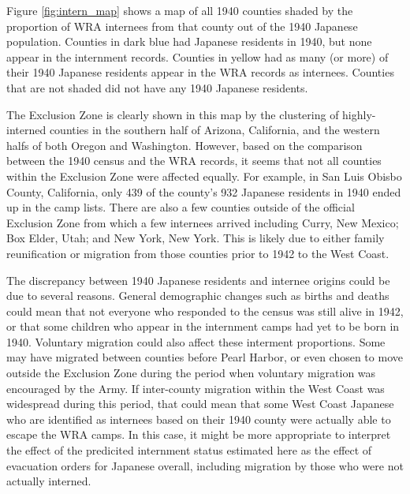 Figure \ref{fig:intern_map} shows a map of all 1940 counties
shaded by the proportion of WRA internees from that county
out of the 1940 Japanese population.
Counties in dark blue had Japanese residents in 1940,
but none appear in the internment records.
Counties in yellow had as many (or more) of their 1940 Japanese residents
appear in the WRA records as internees.
Counties that are not shaded did not have any 1940 Japanese residents.



The Exclusion Zone is clearly shown in this map
by the clustering of highly-interned counties in the southern half of Arizona,
California, and the western halfs of both Oregon and Washington.
However, based on the comparison between the 1940 census and the WRA records,
it seems that not all counties within the Exclusion Zone 
were affected equally.
For example, in San Luis Obisbo County, California,
only 439 of the county's 932 Japanese residents in 1940
ended up in the camp lists.
There are also a few counties outside of the official Exclusion Zone
from which a few internees arrived
including Curry, New Mexico; Box Elder, Utah; and New York, New York.
This is likely due to either family reunification
or migration from those counties prior to 1942 to the West Coast.

The discrepancy between 1940 Japanese residents and internee origins
could be due to several reasons.
General demographic changes such as births and deaths
could mean that not everyone who responded to the census was still alive in 1942,
or that some children who appear in the internment camps 
had yet to be born in 1940.
Voluntary migration could also affect these interment proportions.
Some may have migrated between counties before Pearl Harbor,
or even chosen to move outside the Exclusion Zone
during the period when voluntary migration was encouraged by the Army.
If inter-county migration within the West Coast was widespread during this period,
that could mean that some West Coast Japanese who are identified as internees
based on their 1940 county
were actually able to escape the WRA camps.
In this case, it might be more appropriate to interpret the effect of
the predicited internment status estimated here
as the effect of evacuation orders for Japanese overall,
including migration by those who were not actually interned.


